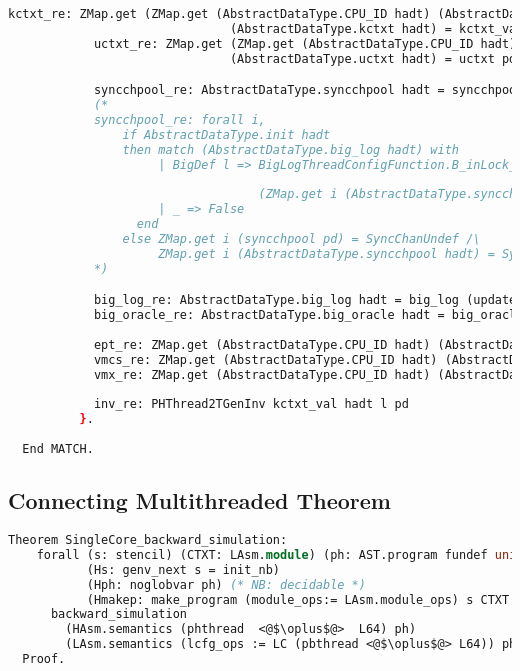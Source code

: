 \begin{lstlisting}[language=Caml]
            kctxt_re: ZMap.get (ZMap.get (AbstractDataType.CPU_ID hadt) (AbstractDataType.cid hadt)) 
                               (AbstractDataType.kctxt hadt) = kctxt_val;
            uctxt_re: ZMap.get (ZMap.get (AbstractDataType.CPU_ID hadt) (AbstractDataType.cid hadt))
                               (AbstractDataType.uctxt hadt) = uctxt pd;

            syncchpool_re: AbstractDataType.syncchpool hadt = syncchpool pd;
            (*
            syncchpool_re: forall i, 
                if AbstractDataType.init hadt
                then match (AbstractDataType.big_log hadt) with 
                     | BigDef l => BigLogThreadConfigFunction.B_inLock_w_index_aux (i + lock_TCB_range)
                                                                                   (AbstractDataType.CPU_ID hadt) l = true ->
                                   (ZMap.get i (AbstractDataType.syncchpool hadt)) = (ZMap.get i (syncchpool pd))
                     | _ => False
                  end 
                else ZMap.get i (syncchpool pd) = SyncChanUndef /\  
                     ZMap.get i (AbstractDataType.syncchpool hadt) = SyncChanUndef;
            *)

            big_log_re: AbstractDataType.big_log hadt = big_log (update init_shared_adt l);
            big_oracle_re: AbstractDataType.big_oracle hadt = big_oracle (update init_shared_adt l);
            
            ept_re: ZMap.get (AbstractDataType.CPU_ID hadt) (AbstractDataType.ept hadt) = ept pd;
            vmcs_re: ZMap.get (AbstractDataType.CPU_ID hadt) (AbstractDataType.vmcs hadt) = vmcs pd;
            vmx_re: ZMap.get (AbstractDataType.CPU_ID hadt) (AbstractDataType.vmx hadt) = vmx pd;
            
            inv_re: PHThread2TGenInv kctxt_val hadt l pd
          }.
                                                       
  End MATCH.

\end{lstlisting}


\subsection{Connecting Multithreaded Theorem}
\label{chapter:certikos:subsec:connecting-multithreaded-theroem}

\begin{lstlisting}[language=Caml]
  Theorem SingleCore_backward_simulation:
    forall (s: stencil) (CTXT: LAsm.module) (ph: AST.program fundef unit)
           (Hs: genv_next s = init_nb)
           (Hph: noglobvar ph) (* NB: decidable *)
           (Hmakep: make_program (module_ops:= LAsm.module_ops) s CTXT (phbthread <@$\oplus$@> L64) = OK ph),
      backward_simulation
        (HAsm.semantics (phthread  <@$\oplus$@>  L64) ph)
        (LAsm.semantics (lcfg_ops := LC (pbthread <@$\oplus$@> L64)) ph).
  Proof.
\end{lstlisting}


